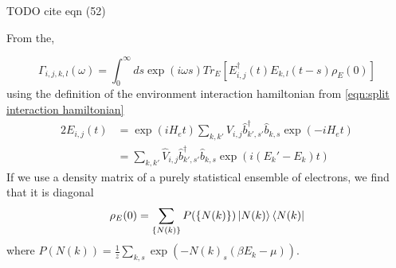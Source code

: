 
TODO cite eqn (52)

From the,

\begin{equation}
    \Gamma_{i,j, k,l}(\omega) =
    \int_0^\infty{}{
    ds \exp{(i\omega{}s)}
    Tr_{E}[E^\dagger_{i,j}(t)E_{k,l}(t-s)\rho_E(0)]
    }
\end{equation}
using the definition of the
environment interaction hamiltonian
from \cref{eqn:split interaction hamiltonian}
\begin{alignat}{2}
    E_{i, j}(t) & =
    \exp{(iH_e t)}
    \sum_{k,k'} V_{i,j} \hat{b}^\dagger_{k',s'}\hat{b}_{k,s}
    \exp{(-iH_e t)}                           \\
                & = \sum_{k,k'} \hat{V}_{i,j}
    \hat{b}^\dagger_{k',s'}\hat{b}_{k,s} \exp{(i(E_k' - E_k)t)}
\end{alignat}
If we use a density matrix of a purely
statistical ensemble of electrons,
we find that it is
diagonal~\cite{sakurai_napolitano_2020}
\begin{equation}
    \rho_E(0) = \sum_{\{N(k)\}} P(\{N(k)\}) \ket{N(k)} \bra{N(k)}
\end{equation}
where \(P(N(k)) =
\frac{1}{z}\sum_{k,s}
\exp{(-{N(k)}_s(\beta E_k - \mu))}\).

